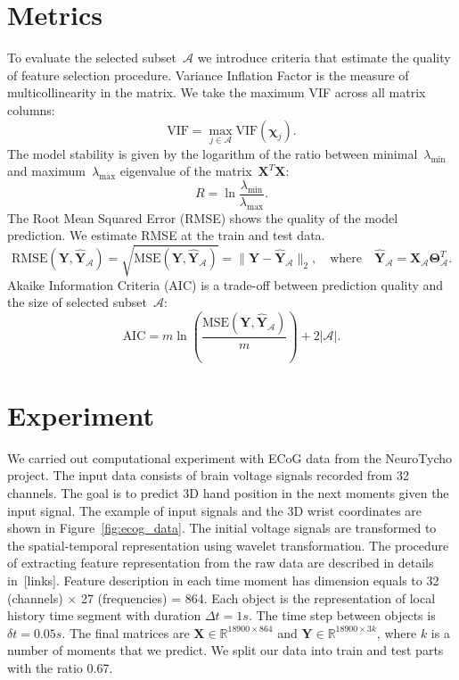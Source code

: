 \documentclass[12pt,twoside]{article}
\newcommand{\bY}{\mathbf{Y}}
\newcommand{\bX}{\mathbf{X}}
\newcommand{\bbR}{\mathbb{R}}
\newcommand{\cA}{\mathcal{A}}
\newcommand{\bchi}{\boldsymbol{\chi}}
\newcommand{\bTheta}{\boldsymbol{\Theta}}
\begin{document}
\section{Metrics}

To evaluate the selected subset~$\cA$ we introduce criteria that estimate the quality of feature selection procedure.
Variance Inflation Factor is the measure of multicollinearity in the matrix. We take the maximum VIF across all matrix columns:
\[
	\text{VIF} = \max_{j \in \cA} \text{VIF} (\bchi_j).
\]
The model stability is given by the logarithm of the ratio between minimal~$\lambda_{\min}$ and maximum~$\lambda_{\max}$ eigenvalue of the matrix~$\bX^T \bX$:
\[
	R = \ln \frac{\lambda_{\min}}{\lambda_{\max}}.
\]
The Root Mean Squared Error (RMSE) shows the quality of the model prediction. We estimate RMSE at the train and test data.
\[
	\text{RMSE}(\bY, \widehat{\bY}_{\cA}) = \sqrt{\text{MSE} (\bY, \widehat{\bY}_{\cA})} =  \| \bY - \widehat{\bY}_{\cA} \|_2, \quad \text{where} \quad \widehat{\bY}_{\cA} = \bX_{\cA} \bTheta_{\cA}^T.
\]
Akaike Information Criteria (AIC) is a trade-off between prediction quality and the size of selected subset~$\cA$:
\[
	\text{AIC} = m \ln \left( \frac{\text{MSE} ( \bY, \widehat{\bY}_{\cA})}{m}\right) + 2 | \cA |.
\]

\section{Experiment}
We carried out computational experiment with ECoG data from the NeuroTycho project. The input data consists of brain voltage signals recorded from 32 channels.
The goal is to predict 3D hand position in the next moments given the input signal.
The example of input signals and the 3D wrist coordinates are shown in Figure~\ref{fig:ecog_data}.
The initial voltage signals are transformed to the spatial-temporal representation using wavelet transformation.
The procedure of extracting feature representation from the raw data are described in details in~[links].
Feature description in each time moment has dimension equals to 32 (channels) $\times$ 27 (frequencies) = 864.
Each object is the representation of local history time segment with duration $\Delta t = 1s$. The time step between objects is $\delta t =  0.05s$.
The final matrices are $\bX \in \bbR^{18900 \times 864}$ and $\bY \in \bbR^{18900 \times 3k}$, where $k$ is a number of moments that we predict.
We split our data into train and test parts with the ratio 0.67.
\end{document}
